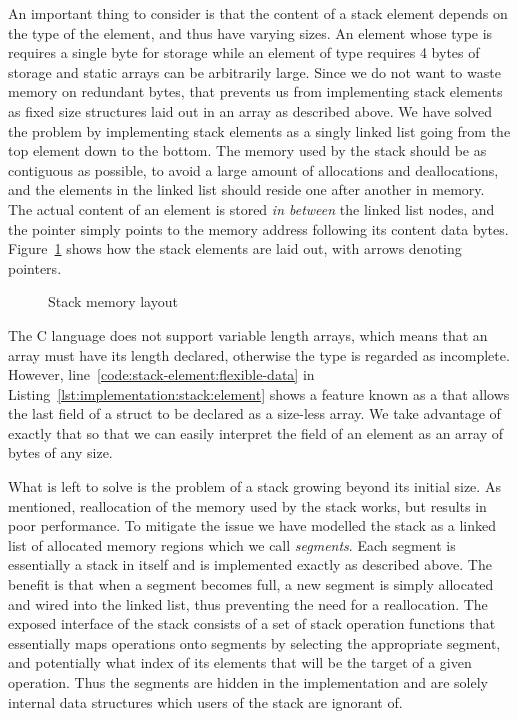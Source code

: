 An important thing to consider is that the content of a stack element depends on
the type of the element, and thus have varying sizes. An element whose type is
 requires a single byte for storage while an element of type
 requires 4 bytes of storage and static arrays can be arbitrarily
large. Since we do not want to waste memory on redundant bytes, that prevents us
from implementing stack elements as fixed size structures laid out in an array
as described above. We have solved the problem by implementing stack elements as
a singly linked list going from the top element down to the bottom. The memory
used by the stack should be as contiguous as possible, to avoid a large amount
of allocations and deallocations, and the elements in the linked list should
reside one after another in memory. The actual content of an element is stored
\textit{in between} the linked list nodes, and the  pointer simply
points to the memory address following its content data
bytes. Figure~\ref{fig:implementation:stack-layout} shows how the stack elements
are laid out, with arrows denoting pointers.

\begin{figure}[H]
  \centering
  
  \caption{Stack memory layout}
  \label{fig:implementation:stack-layout}
\end{figure}

The C language does not support variable length arrays, which means that an
array must have its length declared, otherwise the type is regarded as
incomplete. However, line~\ref{code:stack-element:flexible-data} in
Listing~\ref{lst:implementation:stack:element} shows a feature known as a
 that allows the last field of a struct to be declared as a
size-less array. We take advantage of exactly that so that we can easily
interpret the  field of an element as an array of bytes of any size.

What is left to solve is the problem of a stack growing beyond its initial
size. As mentioned, reallocation of the memory used by the stack works, but
results in poor performance. To mitigate the issue we have modelled the stack as
a linked list of allocated memory regions which we call \textit{segments}. Each
segment is essentially a stack in itself and is implemented exactly as described
above. The benefit is that when a segment becomes full, a new segment is simply
allocated and wired into the linked list, thus preventing the need for a
reallocation. The exposed interface of the stack consists of a set of stack
operation functions that essentially maps operations onto segments by selecting
the appropriate segment, and potentially what index of its elements that will be
the target of a given operation. Thus the segments are hidden in the
implementation and are solely internal data structures which users of the stack
are ignorant of.

